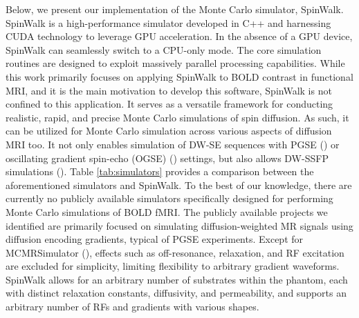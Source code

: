 Below, we present our implementation of the Monte Carlo simulator, SpinWalk. SpinWalk is a high-performance simulator developed in C++ and harnessing CUDA technology to leverage GPU acceleration. In the absence of a GPU device, SpinWalk can seamlessly switch to a CPU-only mode. The core simulation routines are designed to exploit massively parallel processing capabilities. While this work primarily focuses on applying SpinWalk to BOLD contrast in functional MRI, and it is the main motivation to develop this software, SpinWalk is not confined to this application. It serves as a versatile framework for conducting realistic, rapid, and precise Monte Carlo simulations of spin diffusion. As such, it can be utilized for Monte Carlo simulation across various aspects of diffusion MRI too. It not only enables simulation of DW-SE sequences with PGSE (\cite{stejskal1965spin}) or oscillating gradient spin-echo (OGSE) (\cite{does2003oscillating}) settings, but also allows DW-SSFP simulations (\cite{mcnab2010steady}). Table \ref{tab:simulators} provides a comparison between the aforementioned simulators and SpinWalk. To the best of our knowledge, there are currently no publicly available simulators specifically designed for performing Monte Carlo simulations of BOLD fMRI. The publicly available projects we identified are primarily focused on simulating diffusion-weighted MR signals using diffusion encoding gradients, typical of PGSE experiments. Except for MCMRSimulator (\cite{cottaar_2023_10067194}), effects such as off-resonance, relaxation, and RF excitation are excluded for simplicity, limiting flexibility to arbitrary gradient waveforms. SpinWalk allows for an arbitrary number of substrates within the phantom, each with distinct relaxation constants, diffusivity, and permeability, and supports an arbitrary number of RFs and gradients with various shapes.


